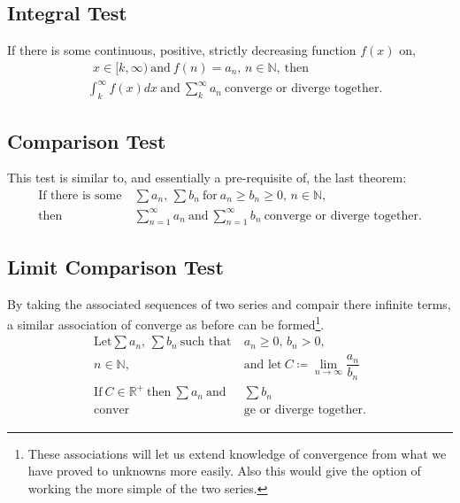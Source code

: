 \documentclass[11pt]{article}
\newcommand{\define}{\coloneqq}
\begin{document}
	\subsection*{Integral Test}
		If there is some continuous, positive, strictly decreasing function $f(x)$ on,
			\begin{align}
				&\ \ x\in[k,\infty)\ \text{and}\ f(n) = a_n,\, n\in\mathbb{N},\ \text{then}\\
				&\int_{k}^{\infty} f(x)dx\ \text{and}\ \sum_{k}^{\infty} a_n\ \text{converge or diverge together.}
			\end{align}

	\subsection*{Comparison Test}
		This test is similar to, and essentially a pre-requisite of, the last theorem: 
			\begin{align}
				\text{If there is some}\ &\sum a_n ,\, \sum b_n \ \text{for} \ a_n \geq b_n \geq 0,\,n\in\mathbb{N}, \\
				\text{then}\ &\sum_{n=1}^{\infty} a_n \ \text{and} \ \sum_{n=1}^{\infty} b_n \ \text{converge or diverge together.}
			\end{align}

	\subsection*{Limit Comparison Test}
		By taking the associated sequences of two series and compair there infinite terms, a similar association of converge as before can
		be formed\footnote{These associations will let us extend knowledge of convergence from what we have proved to unknowns more easily.
		Also this would give the option of working the more simple of the two series.}. 
		\begingroup
			\begin{align}
				\text{Let} \sum a_n,\,\sum b_n \ \text{such that}\ &a_n \geq 0,\, b_n > 0, \\
				n\in\mathbb{N},\ &\text{and let} \ C \define \lim_{n\to\infty} \dfrac{a_n}{b_n}\\
				\text{If} \ C \in\mathbb{R}^{+} \ \text{then} \ \sum a_n \ \text{and}\ &\sum b_n \\
				\text{conver}&\text{ge }\text{or diverge together.}
			\end{align}
		\endgroup
\end{document}

